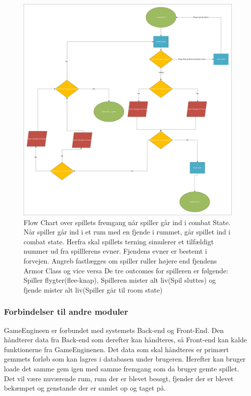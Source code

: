 \begin{figure}[H]
\centering
\includegraphics[width = \textwidth]{02-Body/Images/Arkitektur - Combat State.pdf}
\caption{Flow Chart over spillets fremgang når spiller går ind i combat State. Når spiller går ind i et rum med en fjende i rummet, går spillet ind i combat state. Herfra skal spillets terning simulerer et tilfældigt nummer ud fra spilllerens evner. Fjendens evner er bestemt i forvejen. Angreb fastlægges om spiller ruller højere end fjendens Armor Class og vice versa De tre outcomes for spilleren er følgende: Spiller flygter(flee-knap), Spilleren mister alt liv(Spil sluttes) og fjende mister alt liv(Spiller går til room state)}
\label{fig:Arkitektur-SD-SaveGame}
\end{figure}
\subsubsection{Forbindelser til andre moduler}
GameEngineen er forbundet med systemets Back-end og Front-End. Den håndterer data fra Back-end som derefter kan håndteres, så Front-end kan kalde funktionerne fra GameEnginenen. Det data som skal håndteres er primært gemmets forløb som kan lagres i databasen under brugeren. Herefter kan bruger loade det samme gem igen med samme fremgang som da bruger gemte spillet. Det vil være nuværende rum, rum der er blevet besøgt, fjender der er blevet bekæmpet og genstande der er samlet op og taget på.

